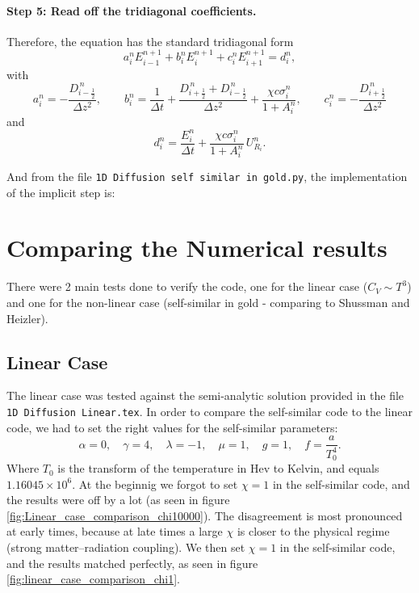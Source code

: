 \documentclass{article}
\begin{document}
\paragraph{Step 5: Read off the tridiagonal coefficients.}
Therefore, the equation has the standard tridiagonal form
\begin{equation}
a_i^n E_{i-1}^{n+1}+b_i^n E_i^{n+1} +c_i^n E_{i+1}^{n+1}=d_i^n,
\end{equation}
with
\begin{equation}
\boxed{a_i^n=-\frac{D_{i-\frac12}^{\,n}}{\Delta z^2},
\qquad
b_i^n=\frac{1}{\Delta t}+\frac{D_{i+\frac12}^{\,n}+D_{i-\frac12}^{\,n}}{\Delta z^2}
+\frac{\chi c \sigma_i^{n}}{1+A_i^n},
\qquad
c_i^n=-\frac{D_{i+\frac12}^{\,n}}{\Delta z^2}}
\end{equation}
and
\begin{equation}
\boxed{d_i^n=\frac{E_i^n}{\Delta t}+\frac{\chi c \sigma_i^{n}}{1+A_i^n}\,U_{R_i}^n.}
\end{equation}

And from the file \texttt{1D Diffusion self similar in gold.py}, the implementation of the implicit step is:

\section{Comparing the Numerical results}
There were 2 main tests done to verify the code, one for the linear case ($C_V\sim T^3$) and one for the non-linear case (self-similar in gold - comparing to Shussman and Heizler).

\subsection{Linear Case}
The linear case was tested against the semi-analytic solution provided in the file \texttt{1D Diffusion Linear.tex}.
In order to compare the self-similar code to the linear code, we had to set the right values for the self-similar parameters:
\begin{equation}
\alpha = 0,\quad \gamma = 4,\quad \lambda = -1,\quad \mu = 1,\quad g = 1,\quad f = \frac{a}{T_0^4}.
\end{equation}
Where $T_0$ is the transform of the temperature in Hev to Kelvin, and equals $1.16045 \times 10^6$. 
At the beginnig we forgot to set $\chi = 1$ in the self-similar code, and the results 
were off by a lot (as seen in figure \ref{fig:Linear_case_comparison_chi10000}). 
The disagreement is most pronounced at early times, because at late times a large $\chi$ is closer to the physical regime (strong matter--radiation coupling).
We then set $\chi = 1$ in the self-similar code, and the results matched perfectly, as seen in figure \ref{fig:linear_case_comparison_chi1}.
\end{document}
